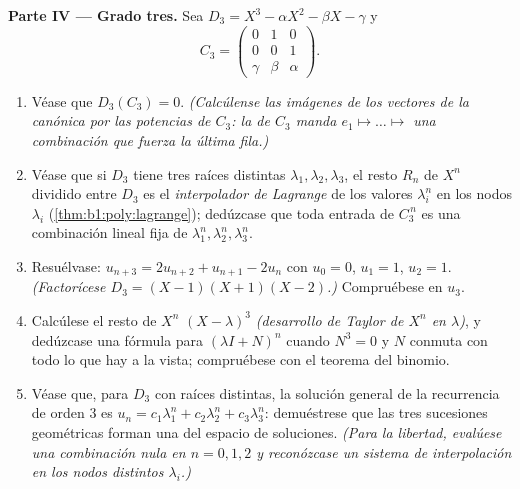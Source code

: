 \begin{problem}
\medskip
\noindent\textbf{Parte IV --- Grado tres.} Sea
$D_3 = X^3 - \alpha X^2 - \beta X - \gamma$ y
\[
C_3 = \begin{pmatrix} 0 & 1 & 0\\ 0 & 0 & 1\\ \gamma & \beta &
\alpha \end{pmatrix}.
\]
\begin{enumerate}[resume]
  \item Véase que $D_3(C_3) = 0$. \emph{(Calcúlense las imágenes de
        los vectores de la  canónica por las potencias de
        $C_3$: la  de $C_3$ manda
        $e_1 \mapsto \dots \mapsto$ una combinación que fuerza la
        última fila.)}
  \item Véase que si $D_3$ tiene tres raíces distintas
        $\lambda_1, \lambda_2, \lambda_3$, el resto $R_n$ de $X^n$
        dividido entre $D_3$ es el \emph{interpolador de Lagrange}
        de los valores $\lambda_i^n$ en los nodos $\lambda_i$
        (\cref{thm:b1:poly:lagrange}); dedúzcase que toda entrada de
        $C_3^{\,n}$ es una combinación lineal fija de
        $\lambda_1^n, \lambda_2^n, \lambda_3^n$.
  \item Resuélvase: $u_{n+3} = 2u_{n+2} + u_{n+1} - 2u_n$ con
        $u_0 = 0$, $u_1 = 1$, $u_2 = 1$. \emph{(Factorícese
        $D_3 = (X - 1)(X + 1)(X - 2)$.)} Compruébese en $u_3$.
  \item Calcúlese el resto de $X^n$  $(X - \lambda)^3$
        \emph{(desarrollo de Taylor de $X^n$ en $\lambda$)}, y
        dedúzcase una fórmula para $(\lambda I + N)^n$ cuando
        $N^3 = 0$ y $N$ conmuta con todo lo que hay a la vista;
        compruébese con el teorema del binomio.
  \item Véase que, para $D_3$ con raíces distintas, la solución
        general de la recurrencia de orden $3$ es
        $u_n = c_1 \lambda_1^n + c_2\lambda_2^n + c_3\lambda_3^n$:
        demuéstrese que las tres sucesiones geométricas forman una
         del espacio de soluciones. \emph{(Para la libertad,
        evalúese una combinación nula en $n = 0, 1, 2$ y
        reconózcase un sistema de interpolación en los nodos
        distintos $\lambda_i$.)}
\end{enumerate}


\end{problem}
